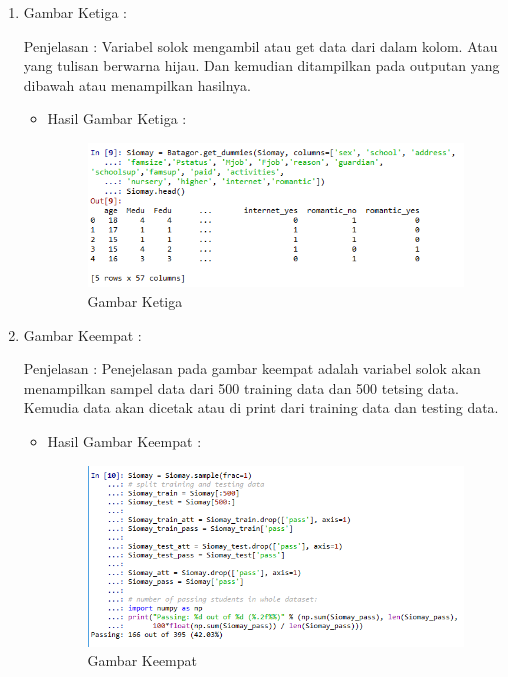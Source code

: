 \begin{itemize}
\begin{enumerate}
\begin{itemize}
\end{itemize}
\par
\item  Gambar Ketiga :
\par Penjelasan : Variabel solok mengambil atau get data dari dalam kolom. Atau yang tulisan berwarna hijau. Dan kemudian ditampilkan pada outputan yang dibawah atau menampilkan hasilnya.
\par 
\begin{itemize}
\par
\item Hasil  Gambar Ketiga :

\begin{figure}[ht]
\centering
\includegraphics[scale=0.5]{figures/AIP/jd3.PNG}
\caption{ Gambar Ketiga}
\label{3}
\end{figure}

\end{itemize}
\par
\item  Gambar Keempat :
\par Penjelasan : Penejelasan pada gambar keempat adalah variabel solok akan menampilkan sampel data dari 500 training data dan 500 tetsing data. Kemudia data akan dicetak atau di print dari training data dan testing data.
\par 
\begin{itemize}
\par
\item Hasil  Gambar Keempat :

\begin{figure}[ht]
\centering
\includegraphics[scale=0.5]{figures/AIP/jd4.PNG}
\caption{ Gambar Keempat}
\label{4}
\end{figure}


\end{itemize}
\end{enumerate}
\end{itemize}
